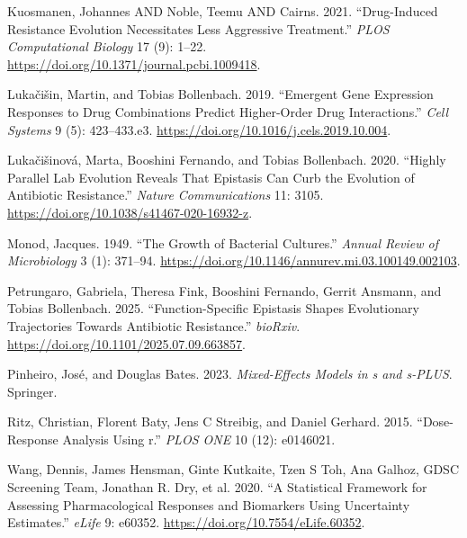 \documentclass[
  letterpaper,
  DIV=11,
  numbers=noendperiod]{scrartcl}
\newlength{\cslhangindent}
\newenvironment{CSLReferences}[2] %
 {\begin{list}{}{%
  \setlength{\itemindent}{0pt}
  \setlength{\leftmargin}{0pt}
  \setlength{\parsep}{0pt}
  \ifodd #1
   \setlength{\leftmargin}{\cslhangindent}
   \setlength{\itemindent}{-1\cslhangindent}
  \fi
  \setlength{\itemsep}{#2\baselineskip}}}
 {\end{list}}
\begin{document}
\begin{CSLReferences}{1}{0}
Kuosmanen, Johannes AND Noble, Teemu AND Cairns. 2021. {``Drug-Induced
Resistance Evolution Necessitates Less Aggressive Treatment.''}
\emph{PLOS Computational Biology} 17 (9): 1--22.
\url{https://doi.org/10.1371/journal.pcbi.1009418}.

Lukačišin, Martin, and Tobias Bollenbach. 2019. {``Emergent Gene
Expression Responses to Drug Combinations Predict Higher-Order Drug
Interactions.''} \emph{Cell Systems} 9 (5): 423--433.e3.
\url{https://doi.org/10.1016/j.cels.2019.10.004}.

Lukačišinová, Marta, Booshini Fernando, and Tobias Bollenbach. 2020.
{``Highly Parallel Lab Evolution Reveals That Epistasis Can Curb the
Evolution of Antibiotic Resistance.''} \emph{Nature Communications} 11:
3105. \url{https://doi.org/10.1038/s41467-020-16932-z}.

Monod, Jacques. 1949. {``The Growth of Bacterial Cultures.''}
\emph{Annual Review of Microbiology} 3 (1): 371--94.
\url{https://doi.org/10.1146/annurev.mi.03.100149.002103}.

Petrungaro, Gabriela, Theresa Fink, Booshini Fernando, Gerrit Ansmann,
and Tobias Bollenbach. 2025. {``Function-Specific Epistasis Shapes
Evolutionary Trajectories Towards Antibiotic Resistance.''}
\emph{bioRxiv}. \url{https://doi.org/10.1101/2025.07.09.663857}.

Pinheiro, José, and Douglas Bates. 2023. \emph{Mixed-Effects Models in s
and s-PLUS}. Springer.

Ritz, Christian, Florent Baty, Jens C Streibig, and Daniel Gerhard.
2015. {``Dose-Response Analysis Using r.''} \emph{PLOS ONE} 10 (12):
e0146021.

Wang, Dennis, James Hensman, Ginte Kutkaite, Tzen S Toh, Ana Galhoz,
GDSC Screening Team, Jonathan R. Dry, et al. 2020. {``A Statistical
Framework for Assessing Pharmacological Responses and Biomarkers Using
Uncertainty Estimates.''} \emph{eLife} 9: e60352.
\url{https://doi.org/10.7554/eLife.60352}.

\end{CSLReferences}
\end{document}
